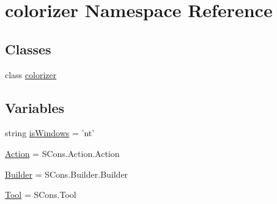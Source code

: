 \hypertarget{namespacecolorizer}{\section{colorizer Namespace Reference}
\label{namespacecolorizer}
}
\subsection*{Classes}
\begin{DoxyCompactItemize}
\item 
class \hyperlink{classcolorizer_1_1colorizer}{colorizer}
\end{DoxyCompactItemize}
\subsection*{Variables}
\begin{DoxyCompactItemize}
\item 
string \hyperlink{namespacecolorizer_a523a6a6c1c2773c7fa8b53f5bfa5eb76}{is\-Windows} = 'nt'
\item 
\hyperlink{namespacecolorizer_ad54e0b191b008f45a3c9a0f46f001ec6}{Action} = S\-Cons.\-Action.\-Action
\item 
\hyperlink{namespacecolorizer_aa50935d1e0570b90d5b17d9215c281ab}{Builder} = S\-Cons.\-Builder.\-Builder
\item 
\hyperlink{namespacecolorizer_ac55e06c89d73d0e0b274c1146e656777}{Tool} = S\-Cons.\-Tool
\end{DoxyCompactItemize}


